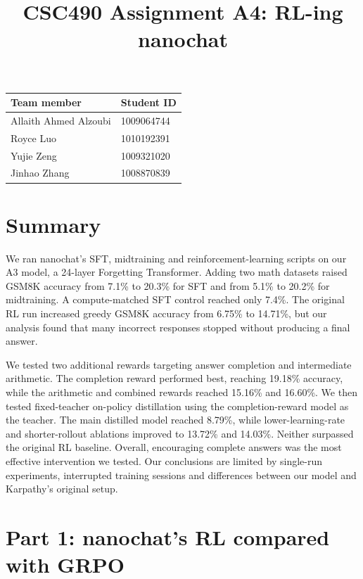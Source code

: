 \documentclass[10pt]{article}
\title{CSC490 Assignment A4: RL-ing nanochat}
\author{}
\date{}
\begin{document}
\maketitle
\vspace{-2.2em}

\begin{center}
\begin{tabular}{ll}
\toprule
Team member & Student ID \\
\midrule
Allaith Ahmed Alzoubi & 1009064744 \\
Royce Luo & 1010192391 \\
Yujie Zeng & 1009321020 \\
Jinhao Zhang & 1008870839 \\
\bottomrule
\end{tabular}
\end{center}

\section*{Summary}
We ran nanochat's SFT, midtraining and reinforcement-learning scripts on our A3 model, a 24-layer Forgetting Transformer. Adding two math datasets raised GSM8K accuracy from 7.1\% to 20.3\% for SFT and from 5.1\% to 20.2\% for midtraining. A compute-matched SFT control reached only 7.4\%. The original RL run increased greedy GSM8K accuracy from 6.75\% to 14.71\%, but our analysis found that many incorrect responses stopped without producing a final answer.

We tested two additional rewards targeting answer completion and intermediate arithmetic. The completion reward performed best, reaching 19.18\% accuracy, while the arithmetic and combined rewards reached 15.16\% and 16.60\%. We then tested fixed-teacher on-policy distillation using the completion-reward model as the teacher. The main distilled model reached 8.79\%, while lower-learning-rate and shorter-rollout ablations improved to 13.72\% and 14.03\%. Neither surpassed the original RL baseline. Overall, encouraging complete answers was the most effective intervention we tested. Our conclusions are limited by single-run experiments, interrupted training sessions and differences between our model and Karpathy's original setup.
\section*{Part 1: nanochat's RL compared with GRPO}
\end{document}
